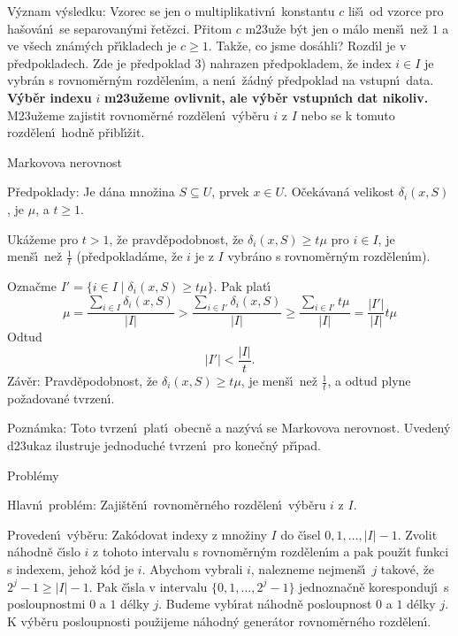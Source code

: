 \flushpar V\'yznam v\'ysledku:  Vzorec se jen o multiplikativn\'\i\ 
konstantu $c$ li\v s\'\i\ od vzorce pro ha\v sov\'an\'\i\ se separovan\'ymi 
\v ret\v ezci.  P\v ritom $c$ m\accent23u\v ze b\'yt jen o m\'alo men\v s\'\i\ ne\v z $
1$ a 
ve v\v sech zn\'am\'ych p\v r\'\i kla\-dech je $c\ge 1$.  Tak\v ze, co jsme 
dos\'ahli?  Rozd\'\i l je v p\v redpokla\-dech.  Zde je p\v redpoklad 3) 
nahrazen p\v redpokladem, \v ze index $i\in I$ je vybr\'an s 
rovnom\v ern\'ym rozd\v elen\'\i m, a nen\'\i\ \v z\'adn\'y p\v redpoklad na vstupn\'\i\ 
data.  {\bf V\'yb\v er indexu} $i$ {\bf m\accent23u\v zeme ov\-liv\-nit, ale v\'yb\v er 
vstupn\'\i ch dat nikoliv.}  M\accent23u\v zeme zajistit rovno\-m\v er\-n\'e 
rozd\v elen\'\i\ v\'yb\v eru $i$ z $I$ nebo se k tomuto rozd\v elen\'\i\ hodn\v e 
p\v ribl\'\i\v zit.  
\medskip

\subhead
Markovova nerovnost
\endsubhead
\smallskip

\flushpar P\v redpoklady: Je d\'ana mno\v zina $S\subseteq U$, prvek $
x\in U$. 
O\v cek\'a\-va\-n\'a velikost $\delta_i(x,S)$, je $\mu$, a $t\ge 
1$.
\medskip

\flushpar Uk\'a\v zeme pro $t>1$, \v ze pravd\v epodobnost, \v ze $
\delta_i(x,S)\ge t\mu$ 
pro $i\in I$, je men\v s\'\i\ ne\v z $\frac 1t$ (p\v redpoklad\'ame, \v ze $
i$ je z $I$ vybr\'ano s 
rovnom\v ern\'ym rozd\v elen\'\i m).  
\medskip

\flushpar Ozna\v cme $I'=\{i\in I\mid\delta_i(x,S)\ge t\mu \}$. Pak plat\'\i
$$\mu =\frac {\sum_{i\in I}\delta_i(x,S)}{|I|}>\frac {\sum_{i\in 
I'}\delta_i(x,S)}{|I|}\ge\frac {\sum_{i\in I'}t\mu}{|I|}=\frac {|
I'|}{|I|}t\mu$$
\flushpar Odtud
$$|I'|<\frac {|I|}t.$$
\flushpar Z\'av\v er: Pravd\v epodobnost, \v ze $\delta_i(x,S)\ge 
t\mu$, je men\v s\'\i\ 
ne\v z $\frac 1t$, a odtud plyne po\v zadovan\'e tvrzen\'\i . 
\medskip

\flushpar Pozn\'amka: Toto tvrzen\'\i\ plat\'\i\ obecn\v e a naz\'yv\'a 
se Markovova nerovnost. Uveden\'y d\accent23ukaz 
ilustruje jednoduch\'e tvrzen\'\i\ pro ko\-ne\v c\-n\'y p\v r\'\i pad.
\medskip

\subhead
Probl\'emy
\endsubhead
\smallskip

\flushpar Hlavn\'\i\ probl\'em: Zaji\v st\v en\'\i\ rovnom\v ern\'eho rozd\v elen\'\i\ 
v\'yb\v eru $i$ z $I$.
\medskip

\flushpar Proveden\'\i\ v\'yb\v eru: Zak\'odovat indexy z mno\v ziny $
I$ do 
\v c\'\i sel $0,1,\dots,|I|-1$. Zvolit n\'ahodn\v e \v c\'\i slo $
i$ z tohoto 
intervalu s rovnom\v ern\'ym rozd\v elen\'\i m a pak pou\v z\'\i t 
funkci s indexem, jeho\v z k\'od je $i$. Abychom vybrali $i$, nalezneme 
nejmen\v s\'\i\ $j$ takov\'e, \v ze $2^j-1\ge |I|-1$. Pak \v c\'\i sla v 
intervalu $\{0,1,\dots,2^j-1\}$ jednozna\v cn\v e koresponduj\'\i\ s 
posloupnostmi $0$ a $1$ d\'elky $j$. Budeme vyb\'\i rat n\'ahodn\v e 
posloupnost $0$ a $1$ d\'elky $j$. K v\'yb\v eru posloupnosti 
pou\v zijeme n\'ahodn\'y gener\'ator rovnom\v ern\'eho rozd\v ele\-n\'\i .
\medskip

